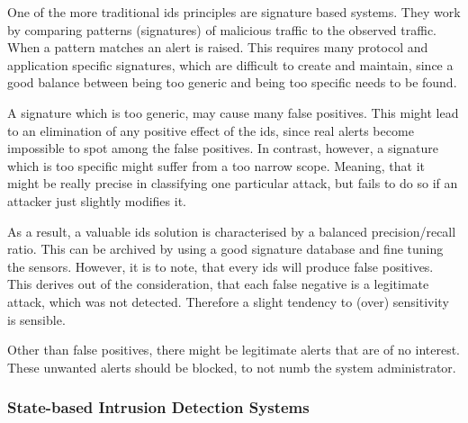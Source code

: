 One of the more traditional \gls{ids} principles are signature based systems.
They work by comparing patterns (signatures) of malicious traffic to the observed traffic. When a pattern matches an alert is raised.
This requires many protocol and application specific signatures, which are difficult to create and maintain, since a good balance between being too generic and being too specific needs to be found.

A signature which is too generic, may cause many false positives. This might lead to an elimination of any positive effect of the \gls{ids}, since real alerts become impossible to spot among the false positives.
In contrast, however, a signature which is too specific might suffer from a too narrow scope. Meaning, that it might be really precise in classifying one particular attack, but fails to do so if an attacker just slightly modifies it.

As a result, a valuable \gls{ids} solution is characterised by a balanced precision/recall ratio. This can be archived by using a good signature database and fine tuning the sensors.
However, it is to note, that every \gls{ids} will produce false positives. This derives out of the consideration, that each false negative is a legitimate attack, which was not detected. Therefore a slight tendency to (over) sensitivity is sensible.

Other than false positives, there might be legitimate alerts that are of no interest. These unwanted alerts should be blocked, to not numb the system administrator. \parencite[pp.~205-206]{Northcutt2005}

\subsubsection{State-based Intrusion Detection Systems}
\label{sec:background:network:ids:state}

